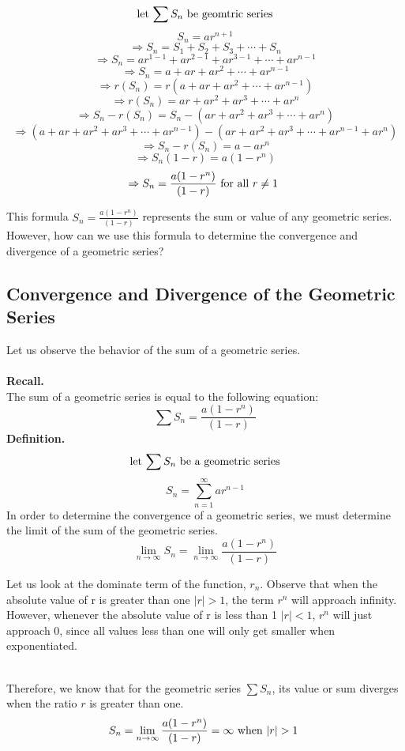 \documentclass{report}
\begin{document}
\begin{sloppypar}
\[ \textrm{let $ \sum S_{n} $ be geomtric series} \]
\[ S_{n} = ar^{n+1}\]
\[ \Rightarrow S_{n} = S_{1} + S_{2} + S_{3} + \cdots + S_{n} \]
\[ \Rightarrow S_{n} = ar^{1-1} + ar^{2-1} + ar^{3-1} + \cdots + ar^{n-1} \]
\[ \Rightarrow S_{n} = a + ar + ar^{2} + \cdots + ar^{n-1} \]
\[ \Rightarrow r(S_{n}) = r(a + ar + ar^{2} + \cdots + ar^{n-1}) \]
\[ \Rightarrow r(S_{n}) = ar + ar^{2} + ar^{3} + \cdots + ar^{n} \]
\[ \Rightarrow S_{n} - r(S_{n}) = S_{n} - (ar + ar^{2} + ar^{3} + \cdots + ar^{n}) \]
\[ \Rightarrow (a + ar + ar^{2} + ar^{3} + \cdots + ar^{n-1}) - (ar + ar^{2} + ar^{3} + \cdots + ar^{n-1} + ar^{n}) \]
\[ \Rightarrow S_{n} - r(S_{n}) = a - ar^{n} \]
\[ \Rightarrow S_{n} (1 - r) = a(1 - r^{n}) \]
\[ \Rightarrow S_{n} = \frac{a(1-r^{n})}{(1-r)} \textrm{ for all $ r \neq 1 $ }\]

This formula $ S_{n} = \frac{a(1-r^{n})}{(1-r)} $ represents the sum or value of any geometric series. However,
how can we use this formula to determine the convergence and divergence of a geometric series?

\subsection{Convergence and Divergence of the Geometric Series}
      Let us observe the behavior of the sum of a geometric series.
      \\
      \\
      \textbf{Recall.}
      \\

      The sum of a geometric series is equal to the following equation:
      \[ \sum S_{n} = \frac{a(1-r^{n})}{(1-r)}\]
      \textbf{Definition.}
      \[ \textrm{let $ \sum S_{n} $ be a geometric series} \]
      \[ S_{n} = \sum_{n=1}^{\infty} ar^{n-1} \]
      In order to determine the convergence of a geometric series,
      we must determine the limit of the sum  of the geometric series.
      \[ \lim_{n \rightarrow \infty}  S_{n} = \lim_{n \rightarrow \infty} \frac{a(1-r^{n})}{(1-r)} \]

      Let us look at the dominate term of the function, $ r_{n} $. Observe
      that when the absolute value of r is greater than one  $ | r| > 1$, the term $ r^{n} $
      will approach infinity. However, whenever the absolute value of r is
      less than 1 $ | r| < 1$, $r^{n}$ will just approach 0, since all values less than one will
      only get smaller when exponentiated.

      \\
      Therefore, we know that for the geometric series $ \sum S_{n} $, its value or sum diverges
      when the ratio $ r $ is greater than one.
      \[ S_{n} = \lim_{n \rightarrow \infty} \frac{a(1-r^{n})}{(1-r)} = \infty \textrm{ when $ | r| > 1 $ }\]


\end{sloppypar}
\end{document}

